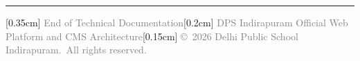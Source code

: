 \documentclass[12pt, a4paper, oneside]{report}
\def\\{}
\def\textbf#1{#1}
\def\&{and}
\begin{document}

\vfill
\begin{center}
  \rule{0.55\textwidth}{0.6pt}\\[0.35cm]
  {\large\textcolor{gray}{\textbf{End of Technical Documentation}}}\\[0.2cm]
  {\small\textcolor{gray}{DPS Indirapuram Official Web Platform \& CMS Architecture}}\\[0.15cm]
  {\small\textcolor{gray}{\copyright\ 2026 Delhi Public School Indirapuram.\ All rights reserved.}}
\end{center}
\end{document}
